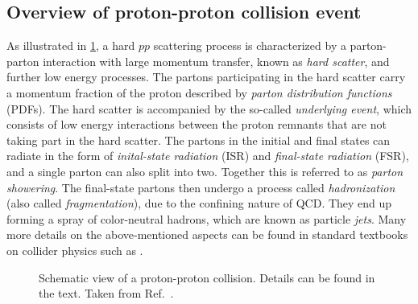 
\subsection{Overview of proton-proton collision event}
\label{subsec:pp-collision-overview}
As illustrated in \cref{fig:ppcol}, a hard $pp$ scattering process is characterized by a parton-parton interaction with large momentum transfer, known as \emph{hard scatter}, and further low energy processes.
The partons participating in the hard scatter carry a momentum fraction of the proton described by \emph{parton distribution functions} (PDFs).
The hard scatter is accompanied by the so-called \emph{underlying event}, which consists of low energy interactions between the proton remnants that are not taking part in the hard scatter.
The partons in the initial and final states can radiate in the form of \emph{inital-state radiation} (ISR) and \emph{final-state radiation} (FSR), and a single parton can also split into two. Together this is referred to as \emph{parton showering}.
The final-state partons then undergo a process called \emph{hadronization} (also called \emph{fragmentation}), due to the confining nature of QCD. They end up forming a spray of color-neutral hadrons, which are known as particle \emph{jets}. Many more details on the above-mentioned aspects can be found in standard textbooks on collider physics such as . 

\begin{figure}[h]
  \caption[Schematic view of a proton-proton collision.]{Schematic view of a proton-proton collision. Details can be found in the text. Taken from Ref.~\cite{Bhatti2010}. }
  \label{fig:ppcol}
\end{figure}



